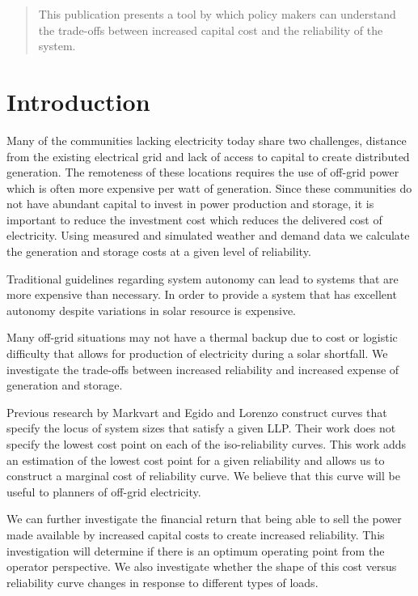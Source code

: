 \documentclass{article}
\begin{document}
\begin{abstract}
This publication presents a tool by which policy makers can
understand the trade-offs between increased capital cost and the
reliability of the system.
\end{abstract}

\section{Introduction}
Many of the communities lacking electricity today share two challenges,
distance from the existing electrical grid and lack of access to capital
to create distributed generation.
The remoteness of these locations requires the use of off-grid power
which is often more expensive per watt of generation.
Since these communities do not have abundant capital to invest in power
production and storage, it is important to reduce the investment cost
which reduces the delivered cost of electricity.
Using measured and simulated weather and demand data we calculate the
generation and storage costs at a given level of reliability.


Traditional guidelines regarding system autonomy can lead to systems
that are more expensive than necessary.
In order to provide a system that has excellent autonomy despite
variations in solar resource is expensive.

Many off-grid situations may not have a thermal backup due to cost or
logistic difficulty that allows for production of electricity during a
solar shortfall.
We investigate the trade-offs between increased reliability and
increased expense of generation and storage.

Previous research by Markvart and Egido and Lorenzo construct curves
that specify the locus of system sizes that satisfy a given LLP.
Their work does not specify the lowest cost point on each of the
iso-reliability curves.
This work adds an estimation of the lowest cost point for a given
reliability and allows us to construct a marginal cost of reliability
curve.
We believe that this curve will be useful to planners of off-grid
electricity.

We can further investigate the financial return that being able to sell
the power made available by increased capital costs to create increased
reliability.
This investigation will determine if there is an optimum operating point
from the operator perspective.
We also investigate whether the shape of this cost versus reliability
curve changes in response to different types of loads.
\end{document}
